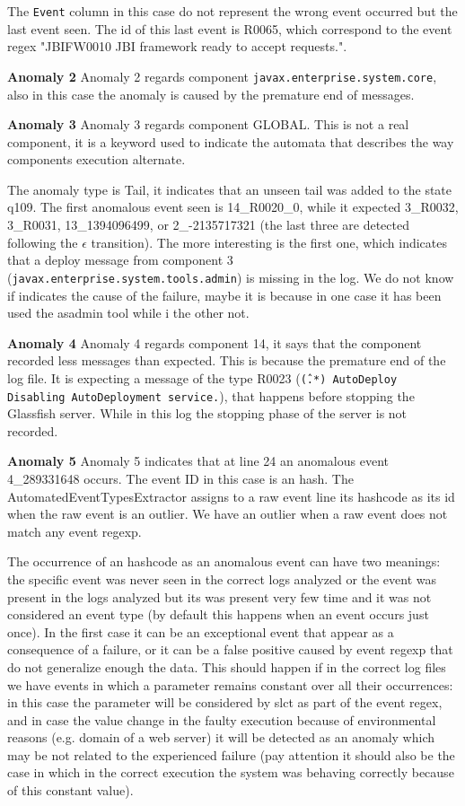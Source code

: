 The \texttt{Event} column
in this case do not represent the wrong event occurred but the last
event seen. The id of this last event is R0065, which correspond to
the event regex
"JBIFW0010 JBI framework ready to accept requests.". 

\textbf{Anomaly 2} 
Anomaly 2 regards component \texttt{javax.enterprise.system.core},
also in this case the anomaly is caused by the premature end of
messages.

\textbf{Anomaly 3} 
Anomaly 3 regards component GLOBAL. This is not a real component, it
is a keyword used to indicate the automata that describes the way
components execution alternate.

The anomaly type is Tail, it indicates that an unseen tail was added
to the state q109. The first anomalous event seen is 14\_R0020\_0,
while it expected 3\_R0032, 3\_R0031, 13\_1394096499, or
2\_-2135717321
(the last three are detected following the $\epsilon$ transition).
The more interesting is the first one, which indicates that a deploy
message from component 3
(\texttt{javax.enterprise.system.tools.admin}) is
missing in the log. We do not know if indicates the cause of the
failure, maybe it is because in one case it has been used the asadmin
tool while i the other not.

\textbf{Anomaly 4} 
Anomaly 4 regards component 14, it says that the component recorded
less messages than expected. This is because the premature end of the
log file. It is expecting a message of the type R0023 (\texttt{\^(.*)
AutoDeploy Disabling AutoDeployment service.}), that happens before
stopping the Glassfish server. While in this log the stopping phase
of the server is not recorded.

\textbf{Anomaly 5} 
Anomaly 5 indicates that at line 24 an anomalous event 4\_289331648
occurs. The event ID in this case is an hash. The
AutomatedEventTypesExtractor assigns to a raw event line its hashcode
as its id when the raw event is an outlier. We have an outlier when a
raw event does not match any event regexp. 

The occurrence of an
hashcode as an anomalous event can have two meanings: the specific
event
was never seen in the correct logs analyzed or the event was
present in the logs analyzed but its was present very few time and it
was not considered an event type (by default this happens when an
event occurs just once). In the first case it can be an exceptional
event that appear as a consequence of a failure, or it can be a false
positive caused by event regexp that do not generalize enough the
data. This should happen if in the correct log files we have events in
which a parameter remains constant over all their occurrences: in
this case the parameter will be considered by slct as part of the
event regex, and in case the value change in the faulty execution
because of environmental reasons (e.g. domain of a web server) it
will be detected as an anomaly which may be not related to the
experienced failure (pay attention it should also be the case in
which in the correct execution the system was behaving correctly
because of this constant value).

